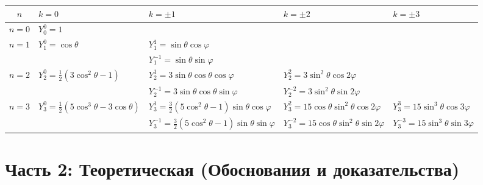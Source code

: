 \documentclass[a4paper,10pt]{article}
\begin{document}
\vspace{0.3cm}
\begin{center}
\renewcommand{\arraystretch}{1.5}
\begin{tabular}{cllll}
\hline
\textbf{$n$} & \textbf{$k=0$} & \textbf{$k=\pm 1$} & \textbf{$k=\pm 2$} & \textbf{$k=\pm 3$} \\
\hline
$n=0$ & $Y_0^0 = 1$ & & & \\
\hline
$n=1$ & $Y_1^0 = \cos\theta$ & $Y_1^1 = \sin\theta\cos\varphi$ & & \\
      &                      & $Y_1^{-1} = \sin\theta\sin\varphi$ & & \\
\hline
$n=2$ & $Y_2^0 = \frac{1}{2}(3\cos^2\theta - 1)$ & $Y_2^1 = 3\sin\theta\cos\theta\cos\varphi$ & $Y_2^2 = 3\sin^2\theta\cos 2\varphi$ & \\
      &                                          & $Y_2^{-1} = 3\sin\theta\cos\theta\sin\varphi$ & $Y_2^{-2} = 3\sin^2\theta\sin 2\varphi$ & \\
\hline
$n=3$ & $Y_3^0 = \frac{1}{2}(5\cos^3\theta - 3\cos\theta)$ & $Y_3^1 = \frac{3}{2}(5\cos^2\theta-1)\sin\theta\cos\varphi$ & $Y_3^2 = 15\cos\theta\sin^2\theta\cos 2\varphi$ & $Y_3^3 = 15\sin^3\theta\cos 3\varphi$ \\
      &                                                    & $Y_3^{-1} = \frac{3}{2}(5\cos^2\theta-1)\sin\theta\sin\varphi$ & $Y_3^{-2} = 15\cos\theta\sin^2\theta\sin 2\varphi$ & $Y_3^{-3} = 15\sin^3\theta\sin 3\varphi$ \\
\hline
\end{tabular}
\end{center}

\newpage
\section{Часть 2: Теоретическая (Обоснования и доказательства)}
\end{document}
